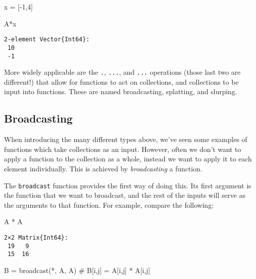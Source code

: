 \documentclass[
  letterpaper,
  DIV=11,
  numbers=noendperiod]{scrreprt}
\newenvironment{Shaded}{\begin{snugshade}}{\end{snugshade}}
\newcommand{\CommentTok}[1]{\textcolor[rgb]{0.37,0.37,0.37}{#1}}
\newcommand{\FloatTok}[1]{\textcolor[rgb]{0.68,0.00,0.00}{#1}}
\newcommand{\FunctionTok}[1]{\textcolor[rgb]{0.28,0.35,0.67}{#1}}
\newcommand{\NormalTok}[1]{\textcolor[rgb]{0.00,0.23,0.31}{#1}}
\newcommand{\OperatorTok}[1]{\textcolor[rgb]{0.37,0.37,0.37}{#1}}
\begin{document}
\begin{Shaded}
\begin{Highlighting}[]
\NormalTok{x }\OperatorTok{=}\NormalTok{ [}\OperatorTok{{-}}\FloatTok{1}\NormalTok{,}\FloatTok{4}\NormalTok{]}

\NormalTok{A}\OperatorTok{*}\NormalTok{x}
\end{Highlighting}
\end{Shaded}

\begin{verbatim}
2-element Vector{Int64}:
 10
 -1
\end{verbatim}

More widely applicable are the \texttt{.}, \texttt{...}, and
\texttt{...} operations (those last two are different!) that allow for
functions to act on collections, and collections to be input into
functions. These are named broadcasting, splatting, and slurping.

\hypertarget{broadcasting}{%
\subsection{Broadcasting}\label{broadcasting}}

When introducing the many different types above, we've seen some
examples of functions which take collections as an input. However, often
we don't want to apply a function to the collection as a whole, instead
we want to apply it to each element individually. This is achieved by
\emph{broadcasting} a function.

The \texttt{broadcast} function provides the first way of doing this.
Its first argument is the function that we want to broadcast, and the
rest of the inputs will serve as the arguments to that function. For
example, compare the following:

\begin{Shaded}
\begin{Highlighting}[]
\NormalTok{A }\OperatorTok{*}\NormalTok{ A}
\end{Highlighting}
\end{Shaded}

\begin{verbatim}
2×2 Matrix{Int64}:
 19   9
 15  16
\end{verbatim}

\begin{Shaded}
\begin{Highlighting}[]
\NormalTok{B }\OperatorTok{=} \FunctionTok{broadcast}\NormalTok{(}\OperatorTok{*}\NormalTok{, A, A) }\CommentTok{\# B[i,j] = A[i,j] * A[i,j]}
\end{Highlighting}
\end{Shaded}
\end{document}
